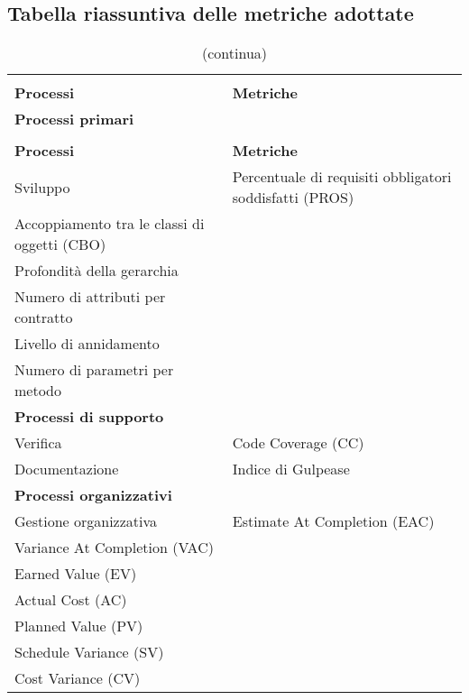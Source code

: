 \pagebreak
\subsection{Tabella riassuntiva delle metriche adottate}
\begin{longtable}{ >{\centering}p{}
		>{\centering}p{}}
	\rowcolor{white}\caption{Tabella riassuntiva delle metriche adottate}\\
	\rowcolorhead
	\textbf{\color{white}Processi}
	& \textbf{\color{white}Metriche} 
	\tabularnewline
	\rowcolorhead 
	\textbf{\centering\color{white}Processi primari}
	& \textbf{\color{white}} 
	\tabularnewline 	
	\endfirsthead
	\rowcolor{white}\caption[]{(continua)} \\
	\rowcolorhead 
	\textbf{\color{white}Processi}
	& \textbf{\color{white}Metriche} 
	\tabularnewline
	\endhead
	
	Sviluppo & Percentuale di requisiti obbligatori soddisfatti (PROS)\\
	Accoppiamento tra le classi di oggetti (CBO) \\Profondità della gerarchia\\Numero di attributi per contratto \\Livello di annidamento \\Numero di parametri per metodo
	
	\tabularnewline
	\rowcolorhead 
	\textbf{\centering\color{white}Processi di supporto}
	& \textbf{\color{white}} 
	\tabularnewline
	\rowcolordark
	Verifica & Code Coverage (CC) 
	
	\tabularnewline
	\rowcolorlight
	Documentazione & Indice di Gulpease
	
	\tabularnewline
	\rowcolorhead 
	\textbf{\centering\color{white}Processi organizzativi}
	& \textbf{\color{white}} 
	\tabularnewline
	\rowcolordark
	Gestione organizzativa & Estimate At Completion (EAC)\\
	Variance At Completion (VAC) \\Earned Value (EV) \\ Actual Cost (AC) \\Planned Value (PV) \\Schedule Variance (SV) \\Cost Variance (CV)
	\tabularnewline
	
\end{longtable}
